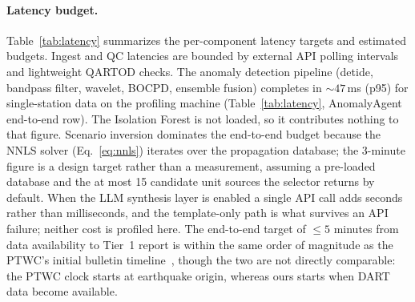 \documentclass{article}
\begin{document}
\paragraph{Latency budget.}
Table~\ref{tab:latency} summarizes the per-component latency targets and
estimated budgets. Ingest and QC latencies are bounded by external
API polling intervals and lightweight QARTOD checks. The anomaly
detection pipeline (detide, bandpass filter, wavelet, BOCPD, ensemble
fusion) completes in ${\sim}47$\,ms (p95) for single-station data on
the profiling machine (Table~\ref{tab:latency}, AnomalyAgent
end-to-end row).  The Isolation Forest is not loaded, so it
contributes nothing to that figure. Scenario inversion dominates the end-to-end
budget because the NNLS solver (Eq.~\ref{eq:nnls}) iterates over the propagation database;
the 3-minute figure is a design target rather than a measurement,
assuming a pre-loaded database and the at most 15 candidate unit
sources the selector returns by default. When the LLM synthesis layer is enabled a single API
call adds seconds rather than milliseconds, and the template-only path
is what survives an API failure; neither cost is profiled here. The
end-to-end target of ${\leq}5$ minutes from data availability to
Tier~1 report is within the same order of magnitude as
the PTWC's initial bulletin timeline~\citep{bernard2015evolution},
though the two are not directly comparable: the PTWC clock starts at
earthquake origin, whereas ours starts when DART data become available.
\end{document}
